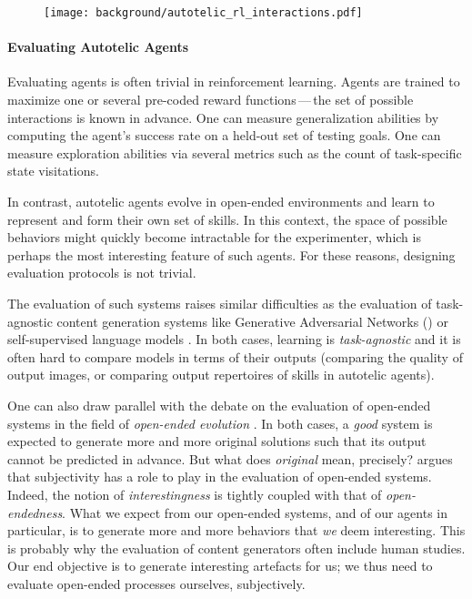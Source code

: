 \begin{figure}[!h]
\centering
\texttt{[image: background/autotelic\_rl\_interactions.pdf]}
\caption{}
\end{figure}

\paragraph{Evaluating Autotelic Agents}

Evaluating agents is often trivial in reinforcement learning. Agents are trained to maximize one or several pre-coded reward functions\,---\,the set of possible interactions is known in advance. One can measure generalization abilities by computing the agent's success rate on a held-out set of testing goals. One can measure exploration abilities via several metrics such as the count of task-specific state visitations.

In contrast, autotelic agents evolve in open-ended environments and learn to represent and form their own set of skills. In this context, the space of possible behaviors might quickly become intractable for the experimenter, which is perhaps the most interesting feature of such agents. For these reasons, designing evaluation protocols is not trivial.

The evaluation of such systems raises similar difficulties as the evaluation of task-agnostic content generation systems like Generative Adversarial Networks (\gan) \citep{goodfellow2014generative} or self-supervised language models \citep{devlin2019bert,brown2020language}. In both cases, learning is \textit{task-agnostic} and it is often hard to compare models in terms of their outputs (\eg comparing the quality of \gan output images, or comparing output repertoires of skills in autotelic agents).

One can also draw parallel with the debate on the evaluation of open-ended systems in the field of \textit{open-ended evolution} \citep{hintze_open-endedness_2019,stanley_role_2016,stanley_why_2019}. In both cases, a \textit{good} system is expected to generate more and more original solutions such that its output cannot be predicted in advance. But what does \textit{original} mean, precisely? \citep{stanley_role_2016} argues that subjectivity has a role to play in the evaluation of open-ended systems. Indeed, the notion of \textit{interestingness} is tightly coupled with that of \textit{open-endedness}. What we expect from our open-ended systems, and of our \rlimgep agents in particular, is to generate more and more behaviors that \textit{we} deem interesting. This is probably why the evaluation of content generators often include human studies. Our end objective is to generate interesting artefacts for us; we thus need to evaluate open-ended processes ourselves, subjectively.

